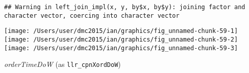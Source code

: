 \documentclass[10pt]{report}
\newenvironment{Shaded}{}{}
\newcommand{\KeywordTok}[1]{\textcolor[rgb]{0.00,0.44,0.13}{\textbf{{#1}}}}
\newcommand{\DataTypeTok}[1]{\textcolor[rgb]{0.56,0.13,0.00}{{#1}}}
\newcommand{\StringTok}[1]{\textcolor[rgb]{0.25,0.44,0.63}{{#1}}}
\newcommand{\NormalTok}[1]{{#1}}
\begin{document}
\begin{Shaded}
\end{Shaded}

\begin{verbatim}
## Warning in left_join_impl(x, y, by$x, by$y): joining factor and character vector, coercing into character vector
\end{verbatim}

\begin{Shaded}
\end{Shaded}

\begin{center}\texttt{[image: /Users/user/dmc2015/ian/graphics/fig\_unnamed-chunk-59-1]} \texttt{[image: /Users/user/dmc2015/ian/graphics/fig\_unnamed-chunk-59-2]} \texttt{[image: /Users/user/dmc2015/ian/graphics/fig\_unnamed-chunk-59-3]} \end{center}

\emph{orderTimeDoW} (as \texttt{llr\_cpnXordDoW})
\end{document}
